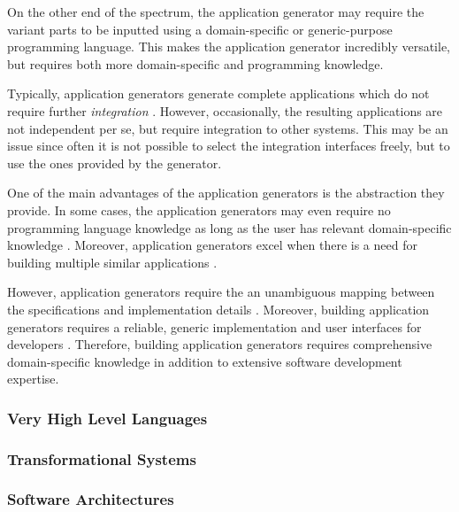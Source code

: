 On the other end of the spectrum, the application generator may require the variant parts to be inputted using a domain-specific or generic-purpose programming language. This makes the application generator incredibly versatile, but requires both more domain-specific and programming knowledge.

Typically, application generators generate complete applications which do not require further \emph{integration} \citep[chap.~7]{krueger_software_1992}. However, occasionally, the resulting applications are not independent per se, but require integration to other systems. This may be an issue since often it is not possible to select the integration interfaces freely, but to use the ones provided by the generator.

One of the main advantages of the application generators is the abstraction they provide. In some cases, the application generators may even require no programming language knowledge as long as the user has relevant domain-specific knowledge \citep{horowitz_survey_1985}. Moreover, application generators excel when there is a need for building multiple similar applications \citep[chap.~7]{krueger_software_1992}. 

However, application generators require the an unambiguous mapping between the specifications and implementation details \citep[chap.~7]{krueger_software_1992}. Moreover, building application generators requires a reliable, generic implementation and user interfaces for developers \citep{cleaveland_building_1988}. Therefore, building application generators requires comprehensive domain-specific knowledge in addition to extensive software development expertise.

\subsubsection{Very High Level Languages}


\subsubsection{Transformational Systems}


\subsubsection{Software Architectures}

